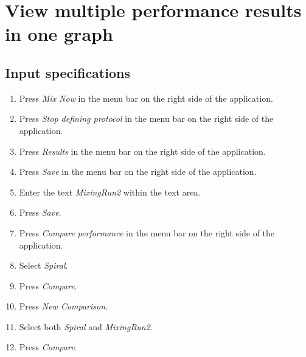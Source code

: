 \section{View multiple performance results in one graph}

\subsection*{Input specifications}
\begin{enumerate}
\item Press \emph{Mix Now} in the menu bar on the right side of the application.
\item Press \emph{Stop defining protocol} in the menu bar on the right side of the application.
\item Press \emph{Results} in the menu bar on the right side of the application.
\item Press \emph{Save} in the menu bar on the right side of the application.
\item Enter the text \emph{MixingRun2} within the text area.

\item Press \emph{Save}.
\item Press \emph{Compare performance} in the menu bar on the right side of the application.
\item Select \emph{Spiral}.
\item Press \emph{Compare}.
\item Press \emph{New Comparison}.

\item Select both \emph{Spiral} and \emph{MixingRun2}.
\item Press \emph{Compare}.
\end{enumerate}

